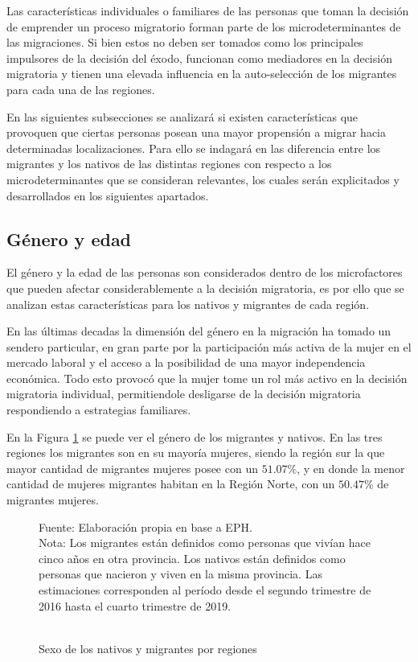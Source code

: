 \documentclass[12pt,a4paper]{article}
\begin{document}
Las características individuales o familiares de las personas que toman la decisión de emprender un proceso migratorio forman parte de los microdeterminantes de las migraciones. Si bien estos no deben ser tomados como los principales impulsores de la decisión del éxodo, funcionan como mediadores en la decisión migratoria y tienen una elevada influencia en la auto-selección de los migrantes para cada una de las regiones.

En las siguientes subsecciones se analizará si existen características que provoquen que ciertas personas posean una mayor propensión a migrar hacia determinadas localizaciones. Para ello se indagará en las diferencia entre los migrantes y los nativos de las distintas regiones con respecto a los microdeterminantes que se consideran relevantes, los cuales serán explicitados y desarrollados en los siguientes apartados.


\subsection{Género y edad}
El género y la edad de las personas son considerados dentro de los microfactores que pueden afectar considerablemente a la decisión migratoria, es por ello que se analizan estas características para los nativos y migrantes de cada región.

En las últimas decadas la dimensión del género en la migración ha tomado un sendero particular, en gran parte por la participación más activa de la mujer en el mercado laboral y el acceso a la posibilidad de una mayor independencia económica. Todo esto provocó que la mujer tome un rol más activo en la decisión migratoria individual, permitiendole desligarse de la decisión migratoria respondiendo a estrategias  familiares.

En la Figura \ref{figure:sexo_mig_} se puede ver el género de los migrantes y nativos. En las tres regiones los migrantes  son en su mayoría mujeres, siendo la región sur la que mayor cantidad de migrantes mujeres posee con un $51.07\%$, y en donde la menor cantidad de mujeres migrantes habitan en la Región Norte, con un $50.47\%$ de migrantes mujeres.

\begin{figure}[ht!]
\begin{center}
 	\caption{\\Sexo de los nativos y migrantes por regiones}
 
 	\label{figure:sexo_mig_}
\begin{flushleft}
\begin{scriptsize}
Fuente: Elaboración propia en base a EPH.\\
Nota: Los migrantes están definidos como personas que vivían hace cinco años en otra provincia. Los nativos están definidos como personas que nacieron y viven en la misma provincia. Las estimaciones corresponden al período desde el segundo trimestre de 2016 hasta el cuarto trimestre de 2019.
\end{scriptsize}
\end{flushleft}
\end{center}
\end{figure}
\end{document}
